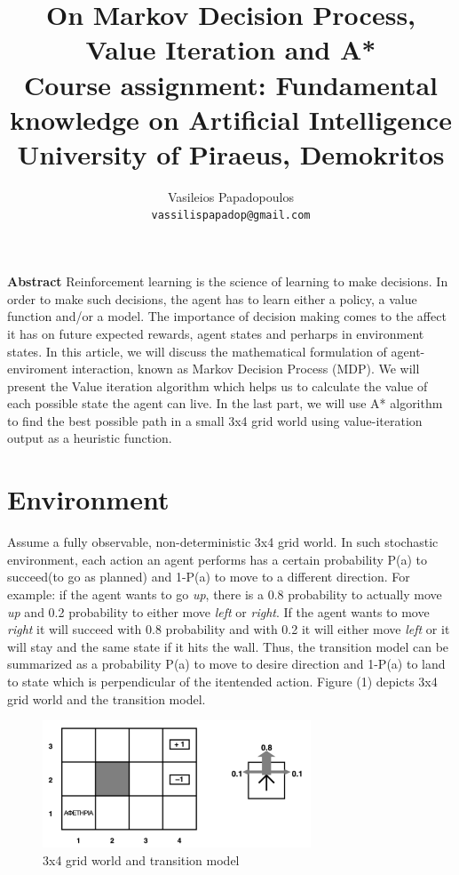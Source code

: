 \documentclass[10pt,a4paper,twocolumn]{article}
\title{%
		On Markov Decision Process, Value Iteration and A* \\
	\large Course assignment: Fundamental knowledge on Artificial Intelligence \\
			University of Piraeus, Demokritos}
\author{Vasileios Papadopoulos \\
		\texttt{vassilispapadop@gmail.com}
}
\begin{document}
	\maketitle
	
	\textbf{Abstract}
	Reinforcement learning is the science of learning to make decisions. In order to make such decisions, the agent has to learn either a policy,	a value function and/or a model. The importance of decision making comes to the affect it has on future expected rewards, agent states and perharps in environment states. In this article, we will discuss the mathematical formulation of agent-enviroment interaction, known as Markov Decision Process (MDP). We will present the Value iteration algorithm which helps us to calculate the value of each possible state the agent can live. In the last part, we will use A* algorithm to find the best possible path in a small 3x4 grid world using value-iteration output as a heuristic function.
	
	
	\section{Environment}
	
	Assume a fully observable, non-deterministic 3x4 grid world. In such stochastic environment, 
	each action an agent performs has a certain probability P(a) to succeed(to go as planned) and 1-P(a) to move to a different direction. 
	For example: if the agent wants to go \textit{up}, there is a 0.8 probability to actually move \textit{up} and 0.2 probability to either move \textit{left} or \textit{right}. If the agent wants to move \textit{right} it will succeed with 0.8 probability and with 0.2 it will either move \textit{left} or it will stay and the same state if it hits the wall. Thus, the transition model can be summarized as a probability P(a) to move to desire direction and 1-P(a) to land to state which is perpendicular of the itentended action. Figure (1) depicts 3x4 grid world and the transition model.
\begin{figure}[ht!]
	\centering
	\includegraphics[width=80mm]{grid_world}
	\caption{3x4 grid world and transition model \label{overflow}}
\end{figure}
	
\end{document}
